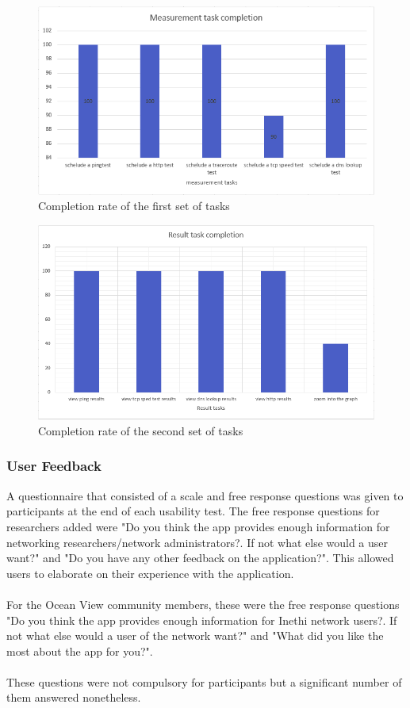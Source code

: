 \begin{figure}
	\centering
	\includegraphics[width=1\linewidth]{images/tasks1}
	\caption{Completion rate of the first set of tasks}
	\label{fig:proto}
\end{figure}

\begin{figure}
	\centering
	\includegraphics[width=1\linewidth]{images/task2}
	\caption{Completion rate of the second set of tasks}
	\label{fig:proto}
\end{figure}
\subsubsection{User Feedback}
A questionnaire that consisted of a scale and free response questions was given to participants  at the end of each usability test. The free response questions for researchers added were "Do you think the app provides enough information for networking researchers/network administrators?. If not what else would a user want?" and "Do you have any other feedback on the application?". This allowed users to elaborate on their experience with the application.
\paragraph{}
For the Ocean View community members, these were the free response questions "Do you think the app provides enough information for Inethi network users?. If not what else would a user of the network want?" and "What did you like the most about the app for you?".
\paragraph{}
These questions were not compulsory for participants but a significant number of them answered nonetheless. 